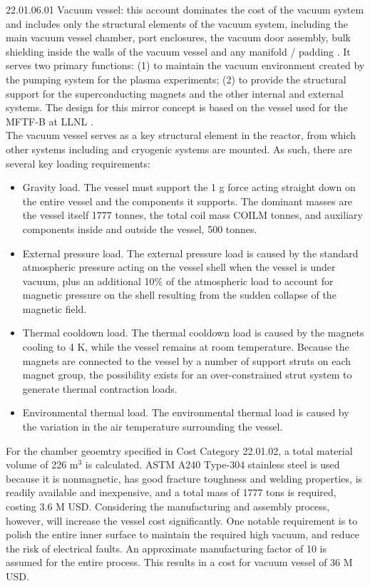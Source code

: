 22.01.06.01 Vacuum vessel: this account dominates the cost of the vacuum system and includes only the structural elements of the vacuum system, including the main vacuum vessel chamber, port enclosures, the vacuum door assembly, bulk shielding inside the walls of the vacuum vessel and any manifold / padding \cite{waganer2006design}. It serves two primary functions: (1) to maintain the vacuum environment created by the pumping system for the plasma experiments; (2) to provide the structural support for the superconducting magnets and the other internal and external systems. The design for this mirror concept is based on the vessel used for the MFTF-B at LLNL \cite{gerich1986design}. \\

The vacuum vessel serves as a  key structural element in the reactor, from which other systems including and cryogenic systems are mounted.  As such, there are several key loading requirements:

\begin{itemize}
    \item Gravity load. The vessel must support the 1 g force acting straight down on the entire vessel and the components it supports. The dominant masses are the vessel itself 1777 tonnes, the total coil mass COILM tonnes, and auxiliary components inside and outside the vessel, 500 tonnes.

    \item External pressure load. The external pressure load is caused by the standard atmospheric pressure acting on the vessel shell when the vessel is under vacuum, plus an additional 10\% of the atmospheric load to account for magnetic  pressure on the shell resulting from the sudden collapse of the magnetic field. 

    \item Thermal cooldown load. The thermal cooldown load is  caused by the magnets cooling to 4 K, while the vessel remains at room temperature. Because the magnets are connected to the vessel by a number of support struts on each  magnet group, the possibility exists for an over-constrained  strut system to generate thermal contraction loads.

    \item Environmental thermal load. The environmental thermal load is caused by the variation in the air temperature surrounding the vessel.

\end{itemize}

For the chamber geoemtry specified in Cost Category 22.01.02, a total material volume of 226 m$^3$ is calculated. ASTM A240 Type-304 stainless steel is used because it is nonmagnetic, has good fracture toughness and welding properties, is readily available and inexpensive, and a total mass of 1777 tons is required, costing 3.6 M USD. Considering the manufacturing and assembly process, however, will increase the vessel cost significantly. One notable requirement is to polish the entire inner surface to maintain the required high vacuum, and reduce the risk of electrical faults. An approximate manufacturing factor of 10 is assumed for the entire process. This results in a cost for vacuum vessel of 36 M USD.\\


